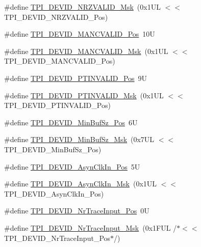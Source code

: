 \begin{DoxyCompactItemize}
\#define \hyperlink{group___c_m_s_i_s___t_p_i_gacecc8710a8f6a23a7d1d4f5674daf02a}{T\-P\-I\-\_\-\-D\-E\-V\-I\-D\-\_\-\-N\-R\-Z\-V\-A\-L\-I\-D\-\_\-\-Msk}~(0x1\-U\-L $<$$<$ T\-P\-I\-\_\-\-D\-E\-V\-I\-D\-\_\-\-N\-R\-Z\-V\-A\-L\-I\-D\-\_\-\-Pos)
\item 
\#define \hyperlink{group___c_m_s_i_s___t_p_i_ga675534579d9e25477bb38970e3ef973c}{T\-P\-I\-\_\-\-D\-E\-V\-I\-D\-\_\-\-M\-A\-N\-C\-V\-A\-L\-I\-D\-\_\-\-Pos}~10\-U
\item 
\#define \hyperlink{group___c_m_s_i_s___t_p_i_ga4c3ee4b1a34ad1960a6b2d6e7e0ff942}{T\-P\-I\-\_\-\-D\-E\-V\-I\-D\-\_\-\-M\-A\-N\-C\-V\-A\-L\-I\-D\-\_\-\-Msk}~(0x1\-U\-L $<$$<$ T\-P\-I\-\_\-\-D\-E\-V\-I\-D\-\_\-\-M\-A\-N\-C\-V\-A\-L\-I\-D\-\_\-\-Pos)
\item 
\#define \hyperlink{group___c_m_s_i_s___t_p_i_ga974cccf4c958b4a45cb71c7b5de39b7b}{T\-P\-I\-\_\-\-D\-E\-V\-I\-D\-\_\-\-P\-T\-I\-N\-V\-A\-L\-I\-D\-\_\-\-Pos}~9\-U
\item 
\#define \hyperlink{group___c_m_s_i_s___t_p_i_ga1ca84d62243e475836bba02516ba6b97}{T\-P\-I\-\_\-\-D\-E\-V\-I\-D\-\_\-\-P\-T\-I\-N\-V\-A\-L\-I\-D\-\_\-\-Msk}~(0x1\-U\-L $<$$<$ T\-P\-I\-\_\-\-D\-E\-V\-I\-D\-\_\-\-P\-T\-I\-N\-V\-A\-L\-I\-D\-\_\-\-Pos)
\item 
\#define \hyperlink{group___c_m_s_i_s___t_p_i_ga3f7da5de2a34be41a092e5eddd22ac4d}{T\-P\-I\-\_\-\-D\-E\-V\-I\-D\-\_\-\-Min\-Buf\-Sz\-\_\-\-Pos}~6\-U
\item 
\#define \hyperlink{group___c_m_s_i_s___t_p_i_ga939e068ff3f1a65b35187ab34a342cd8}{T\-P\-I\-\_\-\-D\-E\-V\-I\-D\-\_\-\-Min\-Buf\-Sz\-\_\-\-Msk}~(0x7\-U\-L $<$$<$ T\-P\-I\-\_\-\-D\-E\-V\-I\-D\-\_\-\-Min\-Buf\-Sz\-\_\-\-Pos)
\item 
\#define \hyperlink{group___c_m_s_i_s___t_p_i_gab382b1296b5efd057be606eb8f768df8}{T\-P\-I\-\_\-\-D\-E\-V\-I\-D\-\_\-\-Asyn\-Clk\-In\-\_\-\-Pos}~5\-U
\item 
\#define \hyperlink{group___c_m_s_i_s___t_p_i_gab67830557d2d10be882284275025a2d3}{T\-P\-I\-\_\-\-D\-E\-V\-I\-D\-\_\-\-Asyn\-Clk\-In\-\_\-\-Msk}~(0x1\-U\-L $<$$<$ T\-P\-I\-\_\-\-D\-E\-V\-I\-D\-\_\-\-Asyn\-Clk\-In\-\_\-\-Pos)
\item 
\#define \hyperlink{group___c_m_s_i_s___t_p_i_ga80ecae7fec479e80e583f545996868ed}{T\-P\-I\-\_\-\-D\-E\-V\-I\-D\-\_\-\-Nr\-Trace\-Input\-\_\-\-Pos}~0\-U
\item 
\#define \hyperlink{group___c_m_s_i_s___t_p_i_gabed454418d2140043cd65ec899abd97f}{T\-P\-I\-\_\-\-D\-E\-V\-I\-D\-\_\-\-Nr\-Trace\-Input\-\_\-\-Msk}~(0x1\-F\-U\-L /$\ast$$<$$<$ T\-P\-I\-\_\-\-D\-E\-V\-I\-D\-\_\-\-Nr\-Trace\-Input\-\_\-\-Pos$\ast$/)
$$
\end{DoxyCompactItemize}
